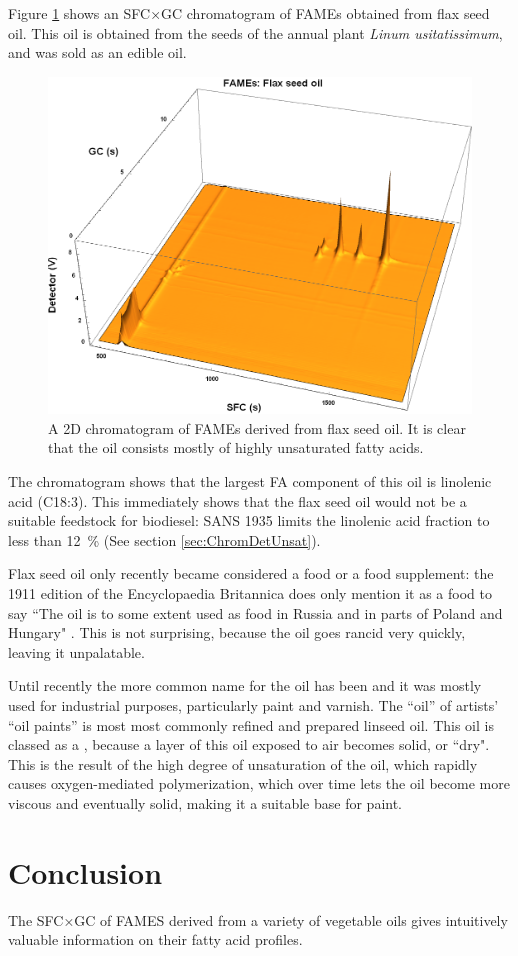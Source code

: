 Figure \ref{fig:2DFlax} shows an SFC×GC chromatogram of FAMEs obtained from flax
seed oil. This oil is obtained from the seeds of the annual plant \textit{Linum
usitatissimum}, and was sold as an edible oil.


\begin{figure}
\centering
\includegraphics[width=\textwidth]{Figures/Flax44.png}
\decoRule

\caption[SFC×GC of flax seed oil]{A 2D chromatogram of FAMEs derived from
flax seed oil. It is clear that the oil consists mostly of highly unsaturated fatty
acids.}

\label{fig:2DFlax}
\end{figure}

The chromatogram shows that the largest FA component of this oil is linolenic
acid (C18:3). This immediately shows that the flax seed oil would not be a
suitable feedstock for biodiesel: SANS 1935 limits the linolenic acid fraction
to less than \SI{12}{\percent} (See section \ref{sec:ChromDetUnsat}).

Flax seed oil only recently became considered a food or a food supplement: the
1911 edition of the Encyclopaedia Britannica does only mention it as a food to
say ``The oil is to some extent used as food in Russia and in parts of Poland
and Hungary" \autocite{Linseed1911}. This is not surprising, because the oil
goes rancid very quickly, leaving it unpalatable.

Until recently the more common name for the oil has been 
and it was mostly used for industrial purposes, particularly paint and varnish.
The ``oil'' of artists' ``oil paints'' is most most commonly refined and
prepared linseed oil. This oil is classed as a , because a
layer of this oil exposed to air becomes solid, or ``dry". This is the result of
the high degree of unsaturation of the oil, which rapidly causes oxygen-mediated
polymerization, which over time lets the oil become more viscous and eventually
solid, making it a suitable base for paint.

\section{Conclusion}

The SFC×GC of FAMES derived from a variety of vegetable oils gives intuitively
valuable information on their fatty acid profiles.

\todos